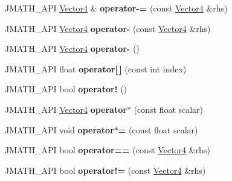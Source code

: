 \begin{DoxyCompactItemize}
\item 
\hypertarget{class_vector4_a4ecca1b58beb1b5396101aad6f41f855}{J\+M\+A\+T\+H\+\_\+\+A\+P\+I \hyperlink{class_vector4}{Vector4} \& {\bfseries operator-\/=} (const \hyperlink{class_vector4}{Vector4} \&rhs)}\label{class_vector4_a4ecca1b58beb1b5396101aad6f41f855}

\item 
\hypertarget{class_vector4_ab89d258291b70ddcdb054f79fa3d8698}{J\+M\+A\+T\+H\+\_\+\+A\+P\+I \hyperlink{class_vector4}{Vector4} {\bfseries operator-\/} (const \hyperlink{class_vector4}{Vector4} \&rhs)}\label{class_vector4_ab89d258291b70ddcdb054f79fa3d8698}

\item 
\hypertarget{class_vector4_a48fe6e0af856527a5f26694266526c45}{J\+M\+A\+T\+H\+\_\+\+A\+P\+I \hyperlink{class_vector4}{Vector4} {\bfseries operator-\/} ()}\label{class_vector4_a48fe6e0af856527a5f26694266526c45}

\item 
\hypertarget{class_vector4_a8803afab9eab1ac63ca07d41f90f5e7e}{J\+M\+A\+T\+H\+\_\+\+A\+P\+I float {\bfseries operator\mbox{[}$\,$\mbox{]}} (const int index)}\label{class_vector4_a8803afab9eab1ac63ca07d41f90f5e7e}

\item 
\hypertarget{class_vector4_aeb9d1ea2c5faf284d7a5d46576cf7cc6}{J\+M\+A\+T\+H\+\_\+\+A\+P\+I bool {\bfseries operator!} ()}\label{class_vector4_aeb9d1ea2c5faf284d7a5d46576cf7cc6}

\item 
\hypertarget{class_vector4_a759f52855aaa78878a10ed23e064dac6}{J\+M\+A\+T\+H\+\_\+\+A\+P\+I \hyperlink{class_vector4}{Vector4} {\bfseries operator$\ast$} (const float scalar)}\label{class_vector4_a759f52855aaa78878a10ed23e064dac6}

\item 
\hypertarget{class_vector4_a08debfccaf6659f0dd9464116d6557b7}{J\+M\+A\+T\+H\+\_\+\+A\+P\+I void {\bfseries operator$\ast$=} (const float scalar)}\label{class_vector4_a08debfccaf6659f0dd9464116d6557b7}

\item 
\hypertarget{class_vector4_ac7c3d13efb6c404178e48a7e9b6f9b70}{J\+M\+A\+T\+H\+\_\+\+A\+P\+I bool {\bfseries operator==} (const \hyperlink{class_vector4}{Vector4} \&rhs)}\label{class_vector4_ac7c3d13efb6c404178e48a7e9b6f9b70}

\item 
\hypertarget{class_vector4_a566430e2debe29ed5e2a2ed6bab42cab}{J\+M\+A\+T\+H\+\_\+\+A\+P\+I bool {\bfseries operator!=} (const \hyperlink{class_vector4}{Vector4} \&rhs)}\label{class_vector4_a566430e2debe29ed5e2a2ed6bab42cab}


\end{DoxyCompactItemize}

